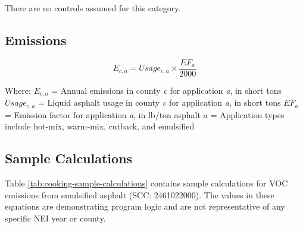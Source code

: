 \documentclass[
  11pt,
  oneside]{book}
\begin{document}
There are no controls assumed for this category.

\subsection{Emissions}\label{emissions}

\begin{equation} 
  E_{c,a} = Usage_{c,a} \times \frac{EF_{a}}{2000}
  \label{eq:cooking-emissions}
\end{equation}

Where: \newline
\(E_{c,a}\) = Annual emissions in county \emph{c} for application \emph{a}, in short tons \newline
\(Usage_{c,a}\) = Liquid asphalt usage in county \emph{c} for application \emph{a}, in short tons \newline
\(EF_{a}\) = Emission factor for application \emph{a}, in lb/ton asphalt \newline
\(a\) = Application types include hot-mix, warm-mix, cutback, and emulsified \newline

\subsection{Sample Calculations}\label{sample-calculations}

Table \ref{tab:cooking-sample-calculations} contains sample calculations for VOC emissions from emulsified asphalt (SCC: 2461022000). The values in these equations are demonstrating program logic and are not representative of any specific NEI year or county.

\begin{table}
\centering
\caption{\label{tab:cooking-sample-calculations}Sample Calculations}
\centering
{}
\end{table}
\end{document}
